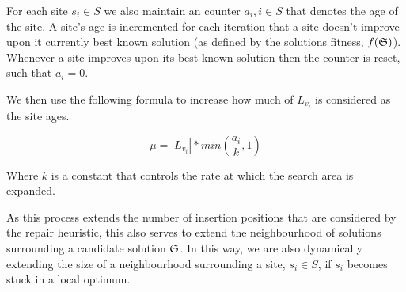 For each site $s_i \in S$ we also maintain an counter $a_i, i \in S$ that denotes the age of the site. A site's age is incremented for each iteration that a site doesn't improve upon it currently best known solution (as defined by the solutions fitness, $f(\mathfrak{S})$). Whenever a site improves upon its best known solution then the counter is reset, such that $a_i = 0$.


We then use the following formula to increase how much of $L_{v_i}$ is considered as the site ages.

\[
   \mu = |L_{v_i}| * min(\frac{a_i}{k}, 1)
\]

Where $k$ is a constant that controls the rate at which the search area is expanded. 

As this process extends the number of insertion positions that are considered by the repair heuristic, this also serves to extend the neighbourhood of solutions surrounding a candidate solution $\mathfrak{S}$. In this way, we are also dynamically extending the size of a neighbourhood surrounding a site, $s_i \in S$, if $s_i$ becomes stuck in a local optimum.


